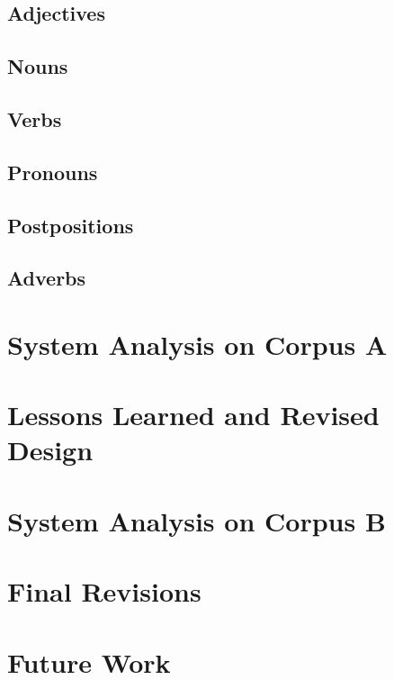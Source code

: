 \documentclass[11pt,letterpaper]{article}
\begin{document}
\subsection{Adjectives}
\subsection{Nouns}
\subsection{Verbs}
\subsection{Pronouns}
\subsection{Postpositions}
\subsection{Adverbs}


\section{System Analysis on Corpus A}

\section{Lessons Learned and Revised Design}

\section{System Analysis on Corpus B}

\section{Final Revisions}

\section{Future Work}




\label{lastpage}
\end{document}
